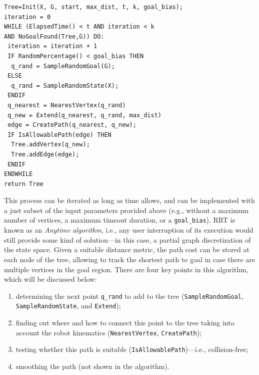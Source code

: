 \begin{center}
\begin{minipage}{0.8\linewidth}
\begin{verbatim}
Tree=Init(X, G, start, max_dist, t, k, goal_bias);
iteration = 0
WHILE (ElapsedTime() < t AND iteration < k 
AND NoGoalFound(Tree,G)) DO:
 iteration = iteration + 1
 IF RandomPercentage() < goal_bias THEN
  q_rand = SampleRandomGoal(G);
 ELSE
  q_rand = SampleRandomState(X);
 ENDIF
 q_nearest = NearestVertex(q_rand)
 q_new = Extend(q_nearest, q_rand, max_dist)
 edge = CreatePath(q_nearest, q_new);
 IF IsAllowablePath(edge) THEN
  Tree.addVertex(q_new);
  Tree.addEdge(edge);
 ENDIF
ENDWHILE
return Tree
\end{verbatim}
\end{minipage}
\end{center}

This process can be iterated as long as time allows, and can be implemented with a just subset of the input parameters provided above (e.g., without a maximum number of vertices, a maximum timeout duration, or a \texttt{goal\_bias}). RRT is known as an \textsl{Anytime algorithm}, i.e., any user interruption of its execution would still provide some kind of solution---in this case, a partial graph discretization of the state space. Given a suitable distance metric, the path cost can be stored at each node of the tree, allowing to track the shortest path to goal in case there are multiple vertices in the goal region.
There are four key points in this algorithm, which will be discussed below:

\begin{enumerate}
    \item determining the next point \texttt{q\_rand} to add to the tree (\texttt{SampleRandomGoal}, \texttt{SampleRandomState}, and \texttt{Extend});
    \item finding out where and how to connect this point to the tree taking into account the robot kinematics (\texttt{NearestVertex}, \texttt{CreatePath});
    \item testing whether this path is suitable (\texttt{IsAllowablePath})---i.e., collision-free;
    \item smoothing the path (not shown in the algorithm).
\end{enumerate}

